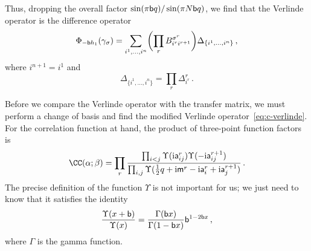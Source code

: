 Thus, dropping the overall factor $\sin(\pi \mathsf{b} q)/\sin(\pi N\mathsf{b} q)$, we
find that the Verlinde operator is the difference operator
\begin{equation}
  \Phi_{-\mathsf{b} h_1}(\gamma_\sigma)
  =
  \sum_{i^1, \dotsc, i^n}
  \biggl(\prod_r B^{\sigma^r}_{i^r i^{r+1}}\biggr)
  \Delta_{\{i^1,\dotsc,i^n\}}  \,,
\end{equation}
where $i^{n+1} = i^1$ and
\begin{equation}
  \Delta_{\{i^1,\dotsc,i^n\}}
  =
  \prod_r \Delta^r_{i^r} \,.
\end{equation}

Before we compare the Verlinde operator with the transfer matrix, we
must perform a change of basis and find the modified Verlinde
operator~\eqref{eq:c-verlinde}.  For the correlation function at hand,
the product of three-point function factors is
\begin{equation}
  \CC(\alpha; \beta)
  =
  \prod_r
  \frac{\prod_{i<j} \Upsilon(\iu \as^r_{ij}) \Upsilon(-\iu \as^{r+1}_{ij})}
       {\prod_{i,j} \Upsilon(\frac12 q + \iu \ms^r - \iu \as^r_i + \iu \as^{r+1}_j)}
  \,.
\end{equation}
The precise definition of the function $\Upsilon$ is not important for
us; we just need to know that it satisfies the identity
\begin{equation}
  \frac{\Upsilon(x + \mathsf{b})}{\Upsilon(x)}
  = \frac{\Gamma(\mathsf{b} x)}{\Gamma(1 - \mathsf{b} x)} \mathsf{b}^{1 - 2\mathsf{b} x} \,,
\end{equation}
where $\Gamma$ is the gamma function.

